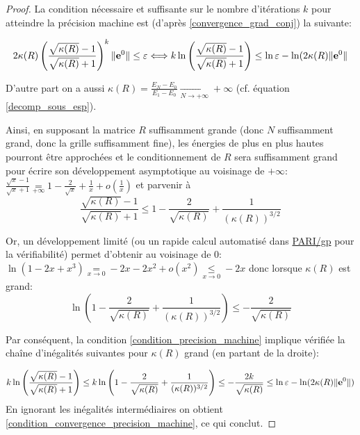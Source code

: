 \documentclass[svgnames,dvipsnames,a4paper,10pt,french]{report}
\begin{document}
\begin{proof}
La condition nécessaire et suffisante sur le nombre d'itérations $k$ pour atteindre la précision machine est (d'après \ref{convergence_grad_conj}) la suivante:


\begin{equation}
\label{condition_convergence_precision_machine}
    2 \kappa (R) \left( \frac{\sqrt{\kappa (R)} - 1}{\sqrt{\kappa (R)} + 1} \right)^k \| \mathbf{e}^0\| \le \varepsilon \Longleftrightarrow  k \ln \left( \frac{\sqrt{\kappa (R)} - 1}{\sqrt{\kappa (R)} + 1} \right)   \le \ln \varepsilon -  \ln (2 \kappa (R) \| \mathbf{e}^0\|
\end{equation}

D'autre part on a aussi $\kappa(R)= \frac{E_N-E_0}{E_1-E_0} \xrightarrow[N \rightarrow + \infty]{} +\infty$ (cf. équation \ref{decomp_sous_esp}).

Ainsi, en supposant la matrice $R$ suffisamment grande (donc $N$ suffisamment grand, donc la grille suffisamment fine), les énergies de plus en plus hautes pourront être approchées et le conditionnement de $R$ sera suffisamment grand pour écrire son développement asymptotique au voisinage de $+\infty$: $\frac{\sqrt{x}-1}{\sqrt{x}+1}\underset{+\infty}{=} 1 - \frac{2}{\sqrt{x}}+ \frac{1}{x} + o\left(\frac{1}{x}\right)$ et parvenir à 
\begin{equation*}
     \frac{\sqrt{\kappa (R)} - 1}{\sqrt{\kappa (R)} + 1}  \le 1-\frac{2}{\sqrt{\kappa (R)}} + \frac{1}{(\kappa (R))^{3/2}}
\end{equation*}




Or, un développement limité (ou un rapide calcul automatisé dans \href{https://pari.math.u-bordeaux.fr/}{PARI/gp} pour la vérifiabilité) permet d'obtenir au voisinage de 0: $\ln (1-2x + x^3) \underset{x\rightarrow 0}{=}-2x-2x^2+o(x^2) \underset{x\rightarrow 0}{\le} -2x$ donc lorsque $\kappa(R)$ est grand:
\begin{equation*}
   \ln \left(1-\frac{2}{\sqrt{\kappa (R)}} + \frac{1}{(\kappa (R))^{3/2}} \right) \le - \frac{2}{\sqrt{\kappa (R)}}
\end{equation*}

Par conséquent, la condition \ref{condition_precision_machine} implique vérifiée la chaîne d'inégalités suivantes pour $\kappa(R)$ grand (en partant de la droite):

\begin{equation*}
    k\ln \left( \frac{\sqrt{\kappa (R)} - 1}{\sqrt{\kappa (R)} + 1} \right) \le k\ln \left(1-\frac{2}{\sqrt{\kappa (R)}} + \frac{1}{(\kappa (R))^{3/2}} \right) \le - \frac{2k}{\sqrt{\kappa (R)}} \le \ln \varepsilon - \ln (2 \kappa (R) \| \mathbf{e}^0\|) 
\end{equation*}
En ignorant les inégalités intermédiaires on obtient \ref{condition_convergence_precision_machine}, ce qui conclut.

\end{proof}
\end{document}
